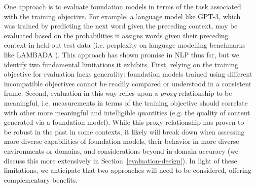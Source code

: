 One approach is to evaluate foundation models in terms of the task associated with the training objective. For example, a language model like GPT-3, which was trained by predicting the next word given the preceding context, may be evaluated based on the probabilities it assigns words given their preceding context in held-out test data (i.e. perplexity on language modelling benchmarks like LAMBADA \citep{paperno2016lambada}). This approach has shown promise in NLP thus far, but we identify two fundamental limitations it exhibits. First, relying on the training objective for evaluation lacks generality: foundation models trained using different incompatible objectives cannot be readily compared or understood in a consistent frame. Second, evaluation in this way relies upon a \textit{proxy} relationship to be meaningful, i.e. measurements in terms of the training objective should correlate with other more meaningful and intelligible quantities (e.g. the quality of content generated via a foundation model). While this proxy relationship has proven to be robust in the past in some contexts, it likely will break down when assessing more diverse capabilities of foundation models, their behavior in more diverse environments or domains, and considerations beyond in-domain accuracy (we discuss this more extensively in Section~\ref{evaluation-design}).
In light of these limitations, we anticipate that two approaches will need to be considered, offering complementary benefits.

